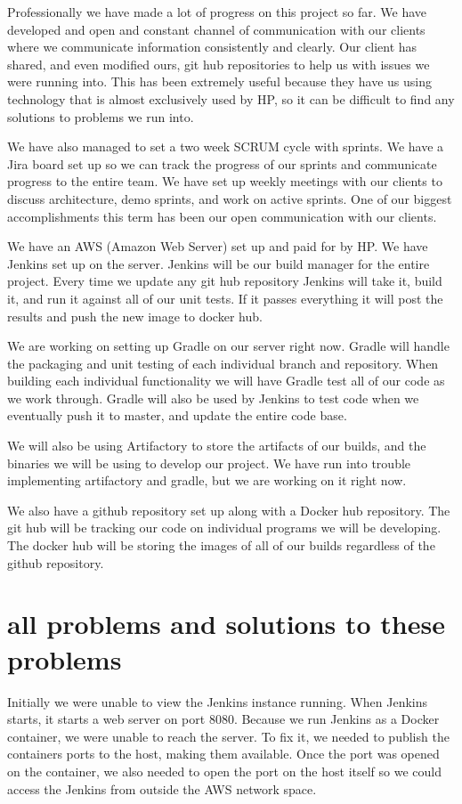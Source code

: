 \documentclass[onecolumn, draftclsnofoot,10pt, compsoc]{IEEEtran}
\begin{document}
Professionally we have made a lot of progress on this project so far. We have developed and open and constant channel of communication with our clients where we communicate information consistently and clearly. Our client has shared, and even modified ours, git hub repositories to help us with issues we were running into. This has been extremely useful because they have us using technology that is almost exclusively used by HP, so it can be difficult to find any solutions to problems we run into. 

We have also managed to set a two week SCRUM cycle with sprints. We have a Jira board set up so we can track the progress of our sprints and communicate progress to the entire team. We have set up weekly meetings with our clients to discuss architecture, demo sprints, and work on active sprints. One of our biggest accomplishments this term has been our open communication with our clients.

We have an AWS (Amazon Web Server) set up and paid for by HP. We have Jenkins set up on the server. Jenkins will be our build manager for the entire project. Every time we update any git hub repository Jenkins will take it, build it, and run it against all of our unit tests. If it passes everything it will post the results and push the new image to docker hub.

We are working on setting up Gradle on our server right now. Gradle will handle the packaging and unit testing of each individual branch and repository. When building each individual functionality we will have Gradle test all of our code as we work through. Gradle will also be used by Jenkins to test code when we eventually push it to master, and update the entire code base.

We will also be using Artifactory to store the artifacts of our builds, and the binaries we will be using to develop our project. We have run into trouble implementing artifactory and gradle, but we are working on it right now. 

We also have a github repository set up along with a Docker hub repository. The git hub will be tracking our code on individual programs we will be developing. The docker hub will be storing the images of all of our builds regardless of the github repository.

\section{all problems and solutions to these problems}
Initially we were unable to view the Jenkins instance running.  When Jenkins starts, it starts a web server on port 8080.  Because we run Jenkins as a Docker container, we were unable to reach the server.  To fix it, we needed to publish the containers ports to the host, making them available.  Once the port was opened on the container, we also needed to open the port on the host itself so we could access the Jenkins from outside the AWS network space.
\end{document}
